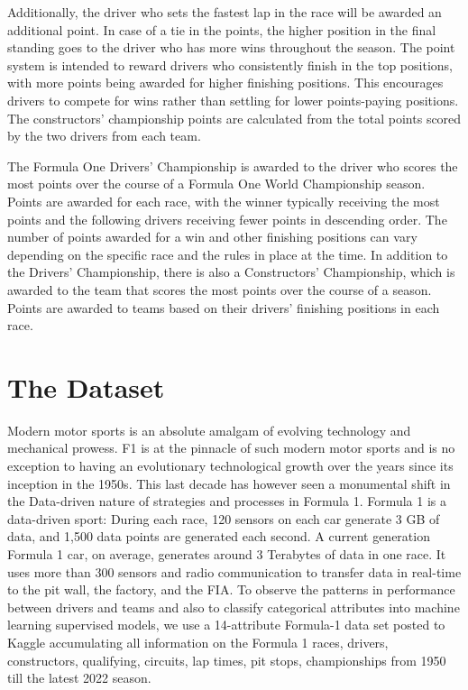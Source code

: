 \documentclass[10pt,twocolumn,letterpaper]{article}
\begin{document}
Additionally, the driver who sets the fastest lap in the race will be awarded an additional point. In case of a tie in the points, the higher position in the final standing goes to the driver who has more wins throughout the season. The point system is intended to reward drivers who consistently finish in the top positions, with more points being awarded for higher finishing positions. This encourages drivers to compete for wins rather than settling for lower points-paying positions. The constructors' championship points are calculated from the total points scored by the two drivers from each team.

The Formula One Drivers' Championship is awarded to the driver who scores the most points over the course of a Formula One World Championship season. Points are awarded for each race, with the winner typically receiving the most points and the following drivers receiving fewer points in descending order. The number of points awarded for a win and other finishing positions can vary depending on the specific race and the rules in place at the time. In addition to the Drivers' Championship, there is also a Constructors' Championship, which is awarded to the team that scores the most points over the course of a season. Points are awarded to teams based on their drivers' finishing positions in each race.


\section{The Dataset}
Modern motor sports is an absolute amalgam of evolving technology and mechanical prowess. F1 is at the pinnacle of such modern motor sports and is no exception to having an evolutionary technological growth over the years since its inception in the 1950s. This last decade has however seen a monumental shift in the Data-driven nature of strategies and processes in Formula 1. Formula 1 is a data-driven sport: During each race, 120 sensors on each car generate 3 GB of data, and 1,500 data points are generated each second. \cite{aws_case_study} A current generation Formula 1 car, on average, generates around 3 Terabytes of data in one race. It uses more than 300 sensors and radio communication to transfer data in real-time to the pit wall, the factory, and the FIA. To observe the patterns in performance between drivers and teams and also to classify categorical attributes into machine learning supervised models, we use a 14-attribute Formula-1 data set posted to Kaggle \cite{kagglef1main} accumulating all information on the Formula 1 races, drivers, constructors, qualifying, circuits, lap times, pit stops, championships from 1950 till the latest 2022 season.
\end{document}
